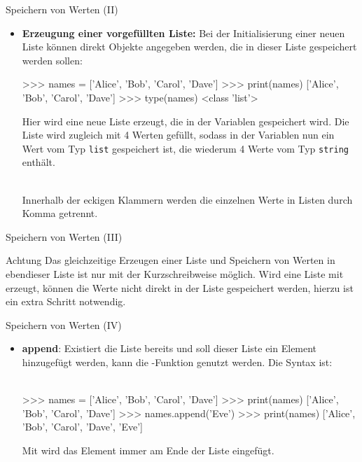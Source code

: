         \begin{frame}[fragile]{Speichern von Werten (II)}
            \begin{itemize}
                \item \textbf{Erzeugung einer vorgefüllten Liste:} Bei der Initialisierung einer neuen Liste können direkt Objekte angegeben werden, die in dieser Liste gespeichert werden sollen: 

\begin{pyconcode}
>>> names = ['Alice', 'Bob', 'Carol', 'Dave']
>>> print(names)
['Alice', 'Bob', 'Carol', 'Dave']
>>> type(names)
<class 'list'>
\end{pyconcode} 
            
                Hier wird eine neue Liste erzeugt, die in der Variablen  gespeichert wird. Die Liste wird zugleich mit 4 Werten gefüllt, sodass in der Variablen nun ein Wert vom Typ \texttt{list} gespeichert ist, die wiederum 4 Werte vom Typ \texttt{string} enthält.\\~\
                
                Innerhalb der eckigen Klammern werden die einzelnen Werte in Listen durch Komma getrennt.
            \end{itemize}
        \end{frame}
        
        \begin{frame}[fragile]{Speichern von Werten (III)}
            \begin{alertblock}{Achtung}
                Das gleichzeitige Erzeugen einer Liste und Speichern von Werten in ebendieser Liste ist nur mit der Kurzschreibweise möglich. Wird eine Liste mit  erzeugt, können die Werte nicht direkt in der Liste gespeichert werden, hierzu ist ein extra Schritt notwendig.
            \end{alertblock}
          \end{frame}
          
        
        \begin{frame}[fragile]{Speichern von Werten (IV)}
            \begin{itemize}
                \item \textbf{append}: Existiert die Liste bereits und soll dieser Liste ein Element hinzugefügt werden, kann die -Funktion genutzt werden. Die Syntax ist: \\~\
                
                
\begin{pyconcode}
>>> names = ['Alice', 'Bob', 'Carol', 'Dave']
>>> print(names)
['Alice', 'Bob', 'Carol', 'Dave']
>>> names.append('Eve')
>>> print(names)
['Alice', 'Bob', 'Carol', 'Dave', 'Eve']
\end{pyconcode} 

        Mit  wird das Element immer am Ende der Liste eingefügt.
            \end{itemize}
        \end{frame}
        
